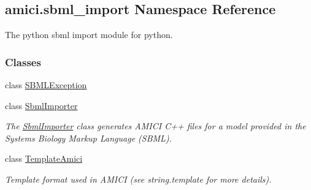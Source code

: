 \hypertarget{namespaceamici_1_1sbml__import}{}\subsection{amici.\+sbml\+\_\+import Namespace Reference}
\label{namespaceamici_1_1sbml__import}


The python sbml import module for python.  


\subsubsection*{Classes}
\begin{DoxyCompactItemize}
\item 
class \mbox{\hyperlink{classamici_1_1sbml__import_1_1_s_b_m_l_exception}{S\+B\+M\+L\+Exception}}
\item 
class \mbox{\hyperlink{classamici_1_1sbml__import_1_1_sbml_importer}{Sbml\+Importer}}
\begin{DoxyCompactList}\small\item\em The \mbox{\hyperlink{classamici_1_1sbml__import_1_1_sbml_importer}{Sbml\+Importer}} class generates A\+M\+I\+CI C++ files for a model provided in the Systems Biology Markup Language (S\+B\+ML). \end{DoxyCompactList}\item 
class \mbox{\hyperlink{classamici_1_1sbml__import_1_1_template_amici}{Template\+Amici}}
\begin{DoxyCompactList}\small\item\em Template format used in A\+M\+I\+CI (see string.\+template for more details). \end{DoxyCompactList}\end{DoxyCompactItemize}
